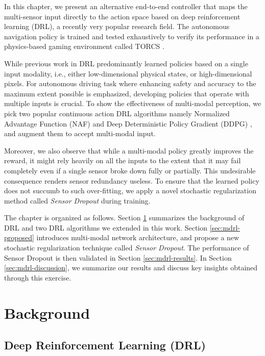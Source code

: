 \documentclass[../thesis.tex]{subfiles}
\begin{document}
In this chapter, we present an alternative end-to-end controller that maps the multi-sensor input directly to the action space based on deep reinforcement learning (DRL), a recently very popular research field. The autonomous navigation policy is trained and tested exhaustively to verify its performance in a physics-based gaming environment called TORCS \cite{wymann2000torcs}. 

While previous work in DRL predominantly learned policies based on a single input modality, i.e., either low-dimensional physical states, or high-dimensional pixels. For autonomous driving task where enhancing safety and accuracy to the maximum extent possible is emphasized, developing policies that operate with multiple inputs is crucial. To show the effectiveness of multi-modal perception, we pick two popular continuous action DRL algorithms namely Normalized Advantage Function (NAF) \cite{CDQN} and Deep Deterministic Policy Gradient (DDPG) \cite{DBLP:journals/corr/LillicrapHPHETS15}, and augment them to accept multi-modal input.

Moreover, we also observe that while a multi-modal policy greatly improves the reward, it might rely heavily on all the inputs to the extent that it may fail completely even if a single sensor broke down fully or partially. This undesirable consequence renders sensor redundancy useless. To ensure that the learned policy does not succumb to such over-fitting, we apply a novel stochastic regularization method called \emph{Sensor Dropout} during training. 

The chapter is organized as follows. Section \ref{sec:mdrl-background} summarizes the background of DRL and two DRL algorithms we extended in this work. Section \ref{sec:mdrl-proposed} introduces multi-modal network architecture, and propose a new stochastic regularization technique called \emph{Sensor Dropout}. The performance of Sensor Dropout is then validated in Section \ref{sec:mdrl-results}. In Section \ref{sec:mdrl-discussion}, we summarize our results and discuss key insights obtained through this exercise. 

\section{Background} \label{sec:mdrl-background}
\subsection{Deep Reinforcement Learning (DRL)}
\end{document}

